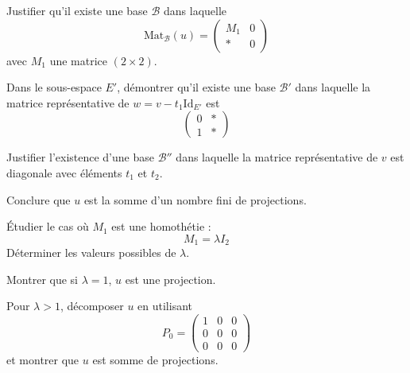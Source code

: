\documentclass[10pt,a4paper]{article}
\newcommand{\Mat}[2]{\mathrm{Mat}_{#1}(#2)}
\begin{document}
\q Justifier qu'il existe une base $\mathscr{B}$ dans laquelle
\[
\Mat{\mathscr{B}}{u} =
\begin{pmatrix}
M_1 & 0\\
* & 0
\end{pmatrix}
\]
avec $M_1$ une matrice $(2 \times 2)$.

\q Dans le sous-espace $E'$, démontrer qu'il existe une base $\mathscr{B}'$ dans laquelle la matrice
représentative de $w = v - t_1 \mathrm{Id}_{E'}$ est
\[
\begin{pmatrix}
0 & *\\
1 & *
\end{pmatrix}
\]

\q Justifier l'existence d'une base $\mathscr{B}''$ dans laquelle la matrice représentative de $v$
est diagonale avec éléments $t_1$ et $t_2$.

\q Conclure que $u$ est la somme d'un nombre fini de projections.

\q Étudier le cas où $M_1$ est une homothétie :
\[
M_1 = \lambda I_2
\]
Déterminer les valeurs possibles de $\lambda$.

\q Montrer que si $\lambda = 1$, $u$ est une projection.

\q Pour $\lambda > 1$, décomposer $u$ en utilisant
\[
P_0 =
\begin{pmatrix}
1 & 0 & 0\\
0 & 0 & 0\\
0 & 0 & 0
\end{pmatrix}
\]
et montrer que $u$ est somme de projections.
\end{document}
